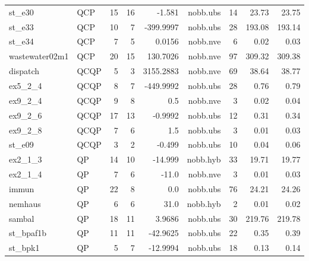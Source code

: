 \documentclass[a4paper,landscape]{article}
\begin{document}
\begin{center}
\begin{tabular}{|l|l|r|r|r|r|r|r|r|}
st\_e30 & QCP & 15 & 16 & -1.581 & nobb.ubs & 14 & 23.73 & 23.75 \\
st\_e33 & QCP & 10 & 7 & -399.9997 & nobb.ubs & 28 & 193.08 & 193.14 \\
st\_e34 & QCP & 7 & 5 & 0.0156 & nobb.nve & 6 & 0.02 & 0.03 \\
wastewater02m1 & QCP & 20 & 15 & 130.7026 & nobb.nve & 97 & 309.32 & 309.38 \\
dispatch & QCQP & 5 & 3 & 3155.2883 & nobb.nve & 69 & 38.64 & 38.77 \\
ex5\_2\_4 & QCQP & 8 & 7 & -449.9992 & nobb.ubs & 28 & 0.76 & 0.79 \\
ex9\_2\_4 & QCQP & 9 & 8 & 0.5 & nobb.nve & 3 & 0.02 & 0.04 \\
ex9\_2\_6 & QCQP & 17 & 13 & -0.9992 & nobb.ubs & 12 & 0.31 & 0.34 \\
ex9\_2\_8 & QCQP & 7 & 6 & 1.5 & nobb.ubs & 3 & 0.01 & 0.03 \\
st\_e09 & QCQP & 3 & 2 & -0.499 & nobb.ubs & 10 & 0.04 & 0.06 \\
ex2\_1\_3 & QP & 14 & 10 & -14.999 & nobb.hyb & 33 & 19.71 & 19.77 \\
ex2\_1\_4 & QP & 7 & 6 & -11.0 & nobb.nve & 3 & 0.01 & 0.03 \\
immun & QP & 22 & 8 & 0.0 & nobb.ubs & 76 & 24.21 & 24.26 \\
nemhaus & QP & 6 & 6 & 31.0 & nobb.hyb & 2 & 0.01 & 0.02 \\
sambal & QP & 18 & 11 & 3.9686 & nobb.ubs & 30 & 219.76 & 219.78 \\
st\_bpaf1b & QP & 11 & 11 & -42.9625 & nobb.ubs & 22 & 0.35 & 0.39 \\
st\_bpk1 & QP & 5 & 7 & -12.9994 & nobb.ubs & 18 & 0.13 & 0.14 \\
\hline  \end{tabular}
\end{center}
\newpage
\end{document}
